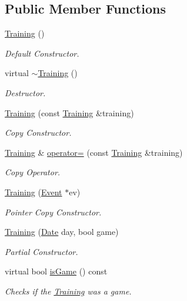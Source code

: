 \subsection*{Public Member Functions}
\begin{DoxyCompactItemize}
\item 
\hyperlink{class_training_af98b1bc7ed710e2fa008a72ad29dbdae}{Training} ()
\begin{DoxyCompactList}\small\item\em Default Constructor. \end{DoxyCompactList}\item 
virtual \hyperlink{class_training_a4a40f758a773c3c63d8558eaa78b1abd}{$\sim$\+Training} ()
\begin{DoxyCompactList}\small\item\em Destructor. \end{DoxyCompactList}\item 
\hyperlink{class_training_a923c500458737327f874067ffc7ca1c9}{Training} (const \hyperlink{class_training}{Training} \&training)
\begin{DoxyCompactList}\small\item\em Copy Constructor. \end{DoxyCompactList}\item 
\hyperlink{class_training}{Training} \& \hyperlink{class_training_aea6dff02f1a10d73ec15ceb310fb7b3f}{operator=} (const \hyperlink{class_training}{Training} \&training)
\begin{DoxyCompactList}\small\item\em Copy Operator. \end{DoxyCompactList}\item 
\hyperlink{class_training_ae39813d608325645cb3403160fc3b493}{Training} (\hyperlink{class_event}{Event} $\ast$ev)
\begin{DoxyCompactList}\small\item\em Pointer Copy Constructor. \end{DoxyCompactList}\item 
\hyperlink{class_training_a314d31d73f207b1c9cb2720da663d225}{Training} (\hyperlink{class_date}{Date} day, bool game)
\begin{DoxyCompactList}\small\item\em Partial Constructor. \end{DoxyCompactList}\item 
virtual bool \hyperlink{class_training_a55530cc22aa771cf3e452c7158b5396e}{is\+Game} () const
\begin{DoxyCompactList}\small\item\em Checks if the \hyperlink{class_training}{Training} was a game. \end{DoxyCompactList}\item 

\end{DoxyCompactItemize}

